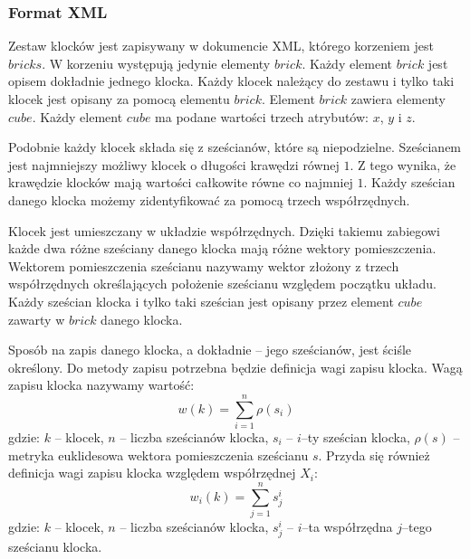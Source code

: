 \documentclass[12pt]{article}
\begin{document}
\subsubsection{Format XML}
Zestaw klocków jest zapisywany w dokumencie XML, którego korzeniem jest
$bricks$. W korzeniu występują jedynie elementy $brick$. Każdy element
$brick$ jest opisem dokładnie jednego klocka. Każdy klocek należący do
zestawu i tylko taki klocek jest opisany za pomocą elementu $brick$.
Element $brick$ zawiera elementy $cube$. Każdy element $cube$ ma podane
wartości trzech atrybutów: $x$, $y$ i $z$.

Podobnie każdy klocek składa się
z sześcianów, które są niepodzielne. Sześcianem jest najmniejszy możliwy
klocek o długości krawędzi równej $1$. Z tego wynika, że krawędzie klocków
mają wartości całkowite równe co najmniej $1$. Każdy sześcian danego
klocka możemy zidentyfikować za pomocą trzech współrzędnych.

Klocek jest
umieszczany w układzie współrzędnych. Dzięki takiemu zabiegowi każde dwa
różne sześciany danego klocka mają różne wektory pomieszczenia. Wektorem
pomieszczenia sześcianu nazywamy wektor złożony z trzech współrzędnych
określających położenie sześcianu względem początku układu. Każdy
sześcian klocka i tylko taki sześcian jest opisany przez element $cube$
zawarty w $brick$ danego klocka.

Sposób na zapis danego klocka, a dokładnie -- jego sześcianów, jest ściśle
określony. Do metody zapisu potrzebna będzie definicja wagi zapisu klocka.
Wagą zapisu klocka nazywamy wartość:
\begin{equation}
	w(k) = \sum_{i=1}^n \rho (s_i)
\end{equation}
gdzie:
$k$ -- klocek,
$n$ -- liczba sześcianów klocka,
$s_i$ -- $i$--ty sześcian klocka,
$\rho (s)$ -- metryka euklidesowa wektora pomieszczenia sześcianu $s$.
Przyda się również definicja wagi zapisu klocka względem współrzędnej
$X_i$:
\begin{equation}
	w_i(k) = \sum_{j=1}^n s_j^i
\end{equation}
gdzie:
$k$ -- klocek,
$n$ -- liczba sześcianów klocka,
$s_j^i$ -- $i$--ta współrzędna $j$--tego sześcianu klocka.
\end{document}
